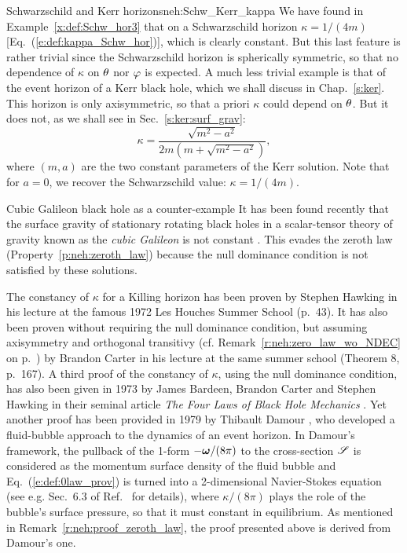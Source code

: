 \begin{texample}{Schwarzschild and Kerr horizons}{neh:Schw_Kerr_kappa}
We have found in Example~\ref{x:def:Schw_hor3}
that on a Schwarzschild horizon $\kappa = 1/(4m)$ [Eq.~(\ref{e:def:kappa_Schw_hor})],
which is clearly constant. But
this last feature is rather trivial since the Schwarzschild horizon is spherically
symmetric, so that no dependence of $\kappa$ on $\theta$ nor $\varphi$ is expected.
A much less trivial example is that of the event horizon of a Kerr black hole,
which we shall discuss in Chap.~\ref{s:ker}. This horizon is only axisymmetric,
so that a priori $\kappa$ could depend on $\theta$. But it does not, as we shall
see in Sec.~\ref{s:ker:surf_grav}:
\[
    \kappa = \frac{\sqrt{m^2 - a^2}}{2m(m + \sqrt{m^2-a^2})} ,
\]
where $(m,a)$ are the two constant parameters of the Kerr solution. Note that for $a=0$,
we recover the Schwarzschild value: $\kappa= 1/(4m)$.
\end{texample}

\begin{texample}{Cubic Galileon black hole as a counter-example}{}
It has been found recently that the surface gravity of stationary rotating black holes
in a scalar-tensor theory of gravity known as the \emph{cubic Galileon}
is not constant \cite{Grand24}.
This evades the zeroth law (Property~\ref{p:neh:zeroth_law})
because the null dominance condition is not satisfied by these solutions.
\end{texample}

\begin{hist}
The constancy of $\kappa$ for a Killing horizon has been proven by Stephen Hawking
in his lecture at the famous 1972 Les Houches Summer School \cite{Hawki73} (p.~43).
It has also been proven without requiring the null dominance condition, but
assuming axisymmetry and orthogonal transitivy (cf. Remark~\ref{r:neh:zero_law_wo_NDEC} on p.~\pageref{r:neh:zero_law_wo_NDEC}) by Brandon Carter in his lecture at the same summer
school
\cite{Carte73b} (Theorem 8, p.~167).
A third proof of the constancy of $\kappa$, using the null dominance condition,
has also been given in 1973 by James Bardeen, Brandon Carter and
Stephen Hawking
in their seminal article \emph{The Four Laws of Black Hole Mechanics}
\cite{BardeCH73}. Yet another proof has been provided in 1979 by Thibault Damour
\cite{Damou79,Damou82}, who developed a fluid-bubble approach to the dynamics of an event horizon.
In Damour's framework, the pullback of the 1-form  $-\bm{\omega}/(8\pi)$ to the cross-section
$\mathscr{S}$ is considered as the momentum surface density of the fluid bubble and Eq.~(\ref{e:def:0law_prov})
is turned into a 2-dimensional Navier-Stokes equation (see e.g. Sec.~6.3 of Ref.~\cite{GourgJ06} for details), where $\kappa/(8\pi)$ plays the role of the
bubble's surface pressure, so that it must constant in equilibrium. As mentioned in Remark~\ref{r:neh:proof_zeroth_law},
the proof presented above is derived from Damour's one.
\end{hist}

